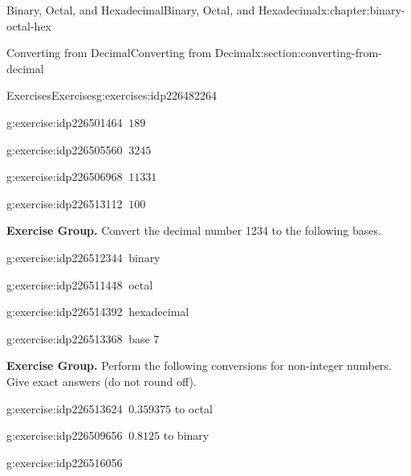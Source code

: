 \documentclass[twoside,10pt,]{book}
\numberwithin{equation}{section}
\begin{document}
\begin{chapterptx}{Binary, Octal, and Hexadecimal}{}{Binary, Octal, and Hexadecimal}{}{}{x:chapter:binary-octal-hex}
\begin{sectionptx}{Converting from Decimal}{}{Converting from Decimal}{}{}{x:section:converting-from-decimal}
\begin{exercises-subsection}{Exercises}{}{Exercises}{}{}{g:exercises:idp226482264}
\begin{exercisegroup}
\begin{divisionexerciseeg}{25}{}{}{g:exercise:idp226501464}%
\(\ 189\)\end{divisionexerciseeg}%
\begin{divisionexerciseeg}{26}{}{}{g:exercise:idp226505560}%
\(\ 3245\)\end{divisionexerciseeg}%
\begin{divisionexerciseeg}{27}{}{}{g:exercise:idp226506968}%
\(\ 11331\)\end{divisionexerciseeg}%
\begin{divisionexerciseeg}{28}{}{}{g:exercise:idp226513112}%
\(\ 100\)\end{divisionexerciseeg}%
\end{exercisegroup}
\par\medskip\noindent
\par\medskip\noindent%
\textbf{Exercise Group.}\space\space%
Convert the decimal number 1234 to the following bases.\begin{exercisegroup}
\begin{divisionexerciseeg}{29}{}{}{g:exercise:idp226512344}%
\(\ \)binary\end{divisionexerciseeg}%
\begin{divisionexerciseeg}{30}{}{}{g:exercise:idp226511448}%
\(\ \)octal\end{divisionexerciseeg}%
\begin{divisionexerciseeg}{31}{}{}{g:exercise:idp226514392}%
\(\ \)hexadecimal\end{divisionexerciseeg}%
\begin{divisionexerciseeg}{32}{}{}{g:exercise:idp226513368}%
\(\ \)base 7\end{divisionexerciseeg}%
\end{exercisegroup}
\par\medskip\noindent
\par\medskip\noindent%
\textbf{Exercise Group.}\space\space%
Perform the following conversions for non-integer numbers.  Give exact answers (do not round off).\begin{exercisegroup}
\begin{divisionexerciseeg}{33}{}{}{g:exercise:idp226513624}%
\(\ 0.359375\) to octal\end{divisionexerciseeg}%
\begin{divisionexerciseeg}{34}{}{}{g:exercise:idp226509656}%
\(\ 0.8125\) to binary\end{divisionexerciseeg}%
\begin{divisionexerciseeg}{35}{}{}{g:exercise:idp226516056}%

\end{divisionexerciseeg}
\end{exercisegroup}
\end{exercises-subsection}
\end{sectionptx}
\end{chapterptx}
\end{document}

